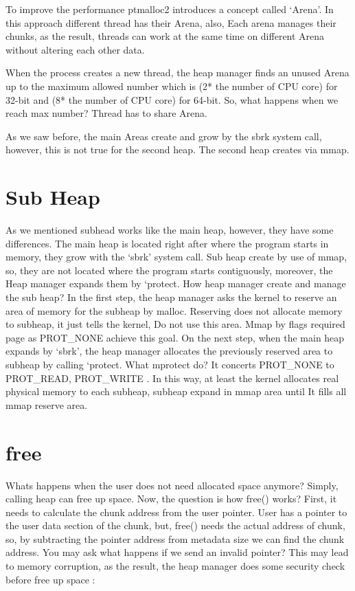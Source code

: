 \documentclass{masterthesis}
\begin{document}
To improve the performance ptmalloc2 introduces a concept called ‘Arena’. In this approach different thread has their Arena, also, Each arena manages their chunks, as the result, threads can work at the same time on different Arena without altering each other data.

When the process creates a new thread, the heap manager finds an unused Arena up to the maximum allowed number which is (2* the number of CPU core) for 32-bit and (8* the number of CPU core) for 64-bit. So, what happens when we reach max number? Thread has to share Arena.

As we saw before, the main Areas create and grow by the sbrk system call, however, this is not true for the second heap. The second heap creates via mmap.

\section{Sub Heap}
As we mentioned subhead works like the main heap, however, they have some differences. The main heap is located right after where the program starts in memory, they grow with the ‘sbrk’ system call. Sub heap create by use of mmap, so, they are not located where the program starts contiguously, moreover, the Heap manager expands them by ‘protect.
How heap manager create and manage the sub heap? In the first step, the heap manager asks the kernel to reserve an area of memory for the subheap by malloc. Reserving does not allocate memory to subheap, it just tells the kernel, Do not use this area. Mmap by flags required page as PROT\_NONE achieve this goal.
On the next step, when the main heap expands by ‘sbrk’, the heap manager allocates the previously reserved area to subheap by calling ‘protect. What mprotect do? It concerts PROT\_NONE to PROT\_READ, PROT\_WRITE . In this way, at least the kernel allocates real physical memory to each subheap, subheap expand in mmap area until It fills all mmap reserve area.

\section{free}
Whats happens when the user does not need allocated space anymore? Simply, calling heap can free up space. Now, the question is how free() works? First, it needs to calculate the chunk address from the user pointer. User has a pointer to the user data section of the chunk, but, free() needs the actual address of chunk, so, by subtracting the pointer address from metadata size we can find the chunk address. You may ask what happens if we send an invalid pointer? This may lead to memory corruption, as the result, the heap manager does some security check before free up space :
\end{document}
